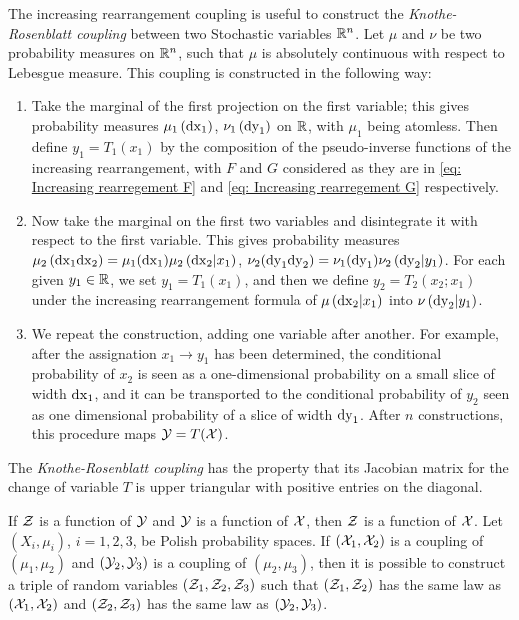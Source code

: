 The increasing rearrangement coupling is useful to construct the \textit{Knothe-Rosenblatt coupling} between two Stochastic variables $\mathbb{R}^n$. Let $\mu$ and $\nu$ be two probability measures on $\mathbb{R}^n$, such that $\mu$ is absolutely continuous with respect to Lebesgue measure. This coupling is constructed in the following way:

\begin{enumerate}
	\item Take the marginal of the first projection on the first variable; this gives probability measures $\mu_1\left( \mathrm{dx}_1 \right)$, $\nu_1\left( \mathrm{dy}_1 \right)$ on $\mathbb{R}$, with $\mu_1$ being atomless. Then define $y_1=T_1(x_1)$ by the composition of the pseudo-inverse functions of the increasing rearrangement, with $F$ and $G$ considered as they are in \eqref{eq: Increasing rearregement F} and \eqref{eq: Increasing rearregement G} respectively.
	
	\item Now take the marginal on the first two variables and disintegrate it with respect to the first variable. This gives probability measures $\mu_2\left( \mathrm{dx}_1\mathrm{dx}_2 \right)=\mu_1(\mathrm{dx}_1)\mu_2\left( \mathrm{dx}_2 |x_1 \right)$, $\nu_2 (\mathrm{dy}_1\mathrm{dy}_2)=\nu_1(\mathrm{dy}_1)\nu_2\left( \mathrm{dy}_2|y_1 \right)$. For each given $y_1\in \mathbb{R}$, we set $y_1=T_1(x_1)$, and then we define $y_2=T_2(x_2; x_1)$ under the increasing rearrangement formula of $\mu\left( \mathrm{dx}_2| x_1 \right)$ into $\nu\left( \mathrm{dy}_2| y_1 \right)$.
	
	\item We repeat the construction, adding one variable after another. For example, after the assignation $x_1\rightarrow y_1$ has been determined, the conditional probability of $x_2$ is seen as a one-dimensional probability on a small slice of width $\mathrm{dx}_1$, and it can be transported to the conditional probability of $y_2$ seen as one dimensional probability of a slice of width $\mathrm{dy}_1$. After $n$ constructions, this procedure maps $\mathcal{Y}=T(\mathcal{X})$.
\end{enumerate} 

The \textit{Knothe-Rosenblatt coupling} has the property that its Jacobian matrix for the change of variable $T$ is upper triangular with positive entries on the diagonal. 	


\begin{lemma} If $\mathcal{Z}$ is a function of $\mathcal{Y}$ and $\mathcal{Y}$ is a function of $\mathcal{X}$, then $\mathcal{Z}$ is a function of $\mathcal{X}$. Let $(X_i , \mu_i)$, $i = 1, 2, 3$,  be Polish probability spaces. If $(\mathcal{X}_1 , \mathcal{X}_2)$ is a coupling of $(\mu_1, \mu_2 )$ and $(\mathcal{Y}_2 , \mathcal{Y}_3)$ is a coupling of $(\mu_2, \mu_3)$, then it is possible to construct a triple of random variables $(\mathcal{Z}_1 , \mathcal{Z}_2, \mathcal{Z}_3)$ such that $(\mathcal{Z}_1, \mathcal{Z}_2)$ has the same law as $(\mathcal{X}_1 ,\mathcal{X}_2)$ and $(\mathcal{Z}_2, \mathcal{Z}_3)$ has the same law as $(\mathcal{Y}_2, \mathcal{Y}_3)$.
\end{lemma}


